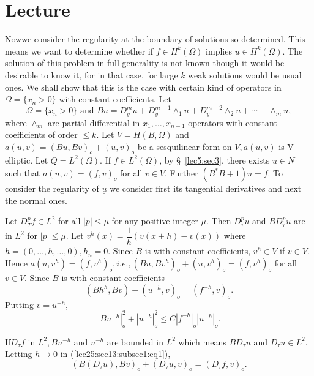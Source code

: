 
\chapter{Lecture}\label{lec25}%

\setcounter{section}{13}

Now\pageoriginale we consider the regularity at the boundary of solutions so
determined. This means we want to determine whether if $f \in H^k
(\Omega)$ implies $u \in H^k (\Omega)$. The solution of this
problem in full generality is not known though it would be desirable
to know it, for in that case, for large $k$ weak solutions would be
usual ones. We shall show that this is the case with certain kind of
operators in $\Omega = \{x_n > 0\}$ with constant coefficients. Let 
$$
\Omega = \{x_n > 0\} \text { and } Bu = D^m_y u + D^{m-1}_y
\wedge_1 u + D^{m-2}_y \wedge_2 u + \cdots + \wedge_m u, 
$$
where $\wedge_m$ are partial differential in $x_1, \ldots, x_{n-1}$
operators with constant coefficients of order $\le k$. Let $V = H(B,
\Omega)$ and $a(u, v) = (Bu, Bv)_o + (u, v)_o$ be a sesquilinear form
on $V, a(u, v)$ is V-elliptic. Let $Q = L^2 (\Omega)$. If $f
\in L^2 (\Omega)$, by \S\ \ref{lec5:sec3}, there exists $u \in N$
such that $a(u, v) = (f, v)_o$ for all $v \in V$. Further
$(B^* B + 1) u = f$. To consider the regularity of $\underline{u}$ we
consider first its tangential derivatives and next the normal ones. 

\begin{proposition}\label{lec25:sec13:subsec1:prop13.1}%
  Let $D^p_T f \in L^2$ for all $|p| \le \mu$ for any positive
  integer $\mu$. Then $D^p_\tau u$ and $B D^p_\tau u$ are in $L^2$ for $|p|
  \le \mu$. Let $v^h (x) = \dfrac{1}{h}(v(x+h) - v(x))$ where $h =
  (0,\ldots, h, \ldots, 0), h_n = 0$. Since $B$ is with constant
  coefficients, $v^h \in V$ if $v \in V$. Hence $a(u,
  v^h) = (f, v^h)_o, i.e., (Bu, Bv^h)_o + (u, v^h)_o = (f, v^h)_o$ for
  all $v \in V$. Since $B$ is with constant coefficients 
  \begin{equation}
    (Bh^h, Bv) + (u^{-h}, v)_o = (f^{-h}, v)_o. \tag{1}\label{lec25:sec13:subsec1:eq1}
  \end{equation}
  Putting $v = u^{-h}$,
  $$
  |Bu^{-h}|^{2}_{o} + |u^{-h}|^2_o \le C |f^{-h}|_o|u^{-h}|_o.
  $$
\end{proposition}

If\pageoriginale $D_\tau f$ in $L^2, Bu^{-h}$ and $u^{-h}$  are bounded in $L^2$
which means $B D_\tau u$ and $D_\tau u \in L^2$. Letting $h
\to 0$ in (\ref{lec25:sec13:subsec1:eq1}), 
$$
(B(D_\tau u), Bv)_o + (D_\tau u, v)_o = (D_\tau f, v)_o.
$$

